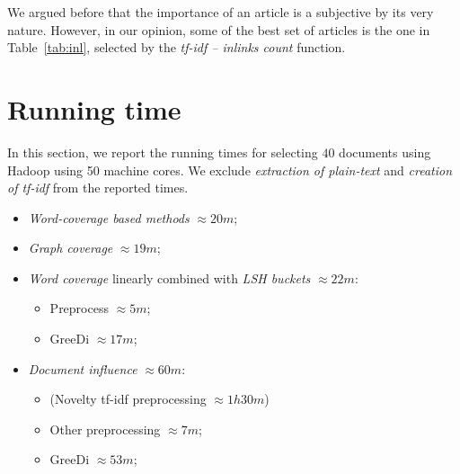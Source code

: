 We argued before that the importance of an article is a subjective by its very
nature.
However, in our opinion, some of the best set of articles is the one in
Table~\ref{tab:inl}, selected by the \emph{tf-idf -- inlinks count} function.

\section{Running time}

In this section, we report the running times for selecting \(40\) documents
using Hadoop using 50 machine cores. We exclude \emph{extraction of plain-text}
and \emph{creation of tf-idf} from the reported times.
\begin{itemize}
  \item \emph{Word-coverage based methods} \(\approx 20m\);
  \item \emph{Graph coverage} \(\approx 19m\);
  \item \emph{Word coverage} linearly combined with \emph{\ac{LSH} buckets}
  \(\approx 22m\):
  \begin{itemize}
    \item Preprocess \(\approx 5m\);
    \item GreeDi \(\approx 17m\);
  \end{itemize}
  \item \emph{Document influence}
  \(\approx 60m\):
  \begin{itemize}
    \item (Novelty tf-idf preprocessing \(\approx 1h 30m\))
    \item Other preprocessing \(\approx 7m\);
    \item GreeDi \(\approx 53m\);
  \end{itemize}
\end{itemize}

